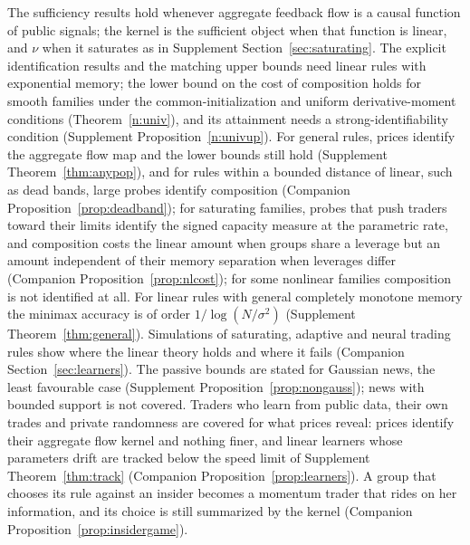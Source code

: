 \documentclass[12pt]{article}
\theoremstyle{definition}
\theoremstyle{remark}
\begin{document}
The sufficiency results hold whenever aggregate feedback flow is a causal function of public signals; the kernel is the sufficient object when that function is linear, and $\nu$ when it saturates as in Supplement Section~\ref{sec:saturating}. The explicit identification results and the matching upper bounds need linear rules with exponential memory; the lower bound on the cost of composition holds for smooth families under the common-initialization and uniform derivative-moment conditions (Theorem~\ref{n:univ}), and its attainment needs a strong-identifiability condition (Supplement Proposition~\ref{n:univup}). For general rules, prices identify the aggregate flow map and the lower bounds still hold (Supplement Theorem~\ref{thm:anypop}), and for rules within a bounded distance of linear, such as dead bands, large probes identify composition (Companion Proposition~\ref{prop:deadband}); for saturating families, probes that push traders toward their limits identify the signed capacity measure at the parametric rate, and composition costs the linear amount when groups share a leverage but an amount independent of their memory separation when leverages differ (Companion Proposition~\ref{prop:nlcost}); for some nonlinear families composition is not identified at all. For linear rules with general completely monotone memory the minimax accuracy is of order $1/\log(N/\sigma^2)$ (Supplement Theorem~\ref{thm:general}). Simulations of saturating, adaptive and neural trading rules show where the linear theory holds and where it fails (Companion Section~\ref{sec:learners}). The passive bounds are stated for Gaussian news, the least favourable case (Supplement Proposition~\ref{prop:nongauss}); news with bounded support is not covered. Traders who learn from public data, their own trades and private randomness are covered for what prices reveal: prices identify their aggregate flow kernel and nothing finer, and linear learners whose parameters drift are tracked below the speed limit of Supplement Theorem~\ref{thm:track} (Companion Proposition~\ref{prop:learners}). A group that chooses its rule against an insider becomes a momentum trader that rides on her information, and its choice is still summarized by the kernel (Companion Proposition~\ref{prop:insidergame}).
\end{document}
